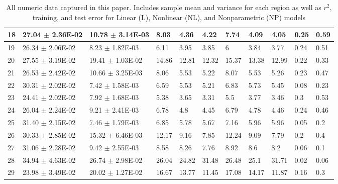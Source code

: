 \documentclass[12pt]{article}
\begin{document}
\begin{landscape}
\begin{table}
\begin{tabular}{|l|l|l|l|l|l|l|l|l|l|l|}
18&27.04 $\pm$ 2.36E-02& 10.78 $\pm$ 3.14E-03&8.03&4.36&4.22&7.74&4.09&4.05&0.25&0.59\\\hline
19&26.34 $\pm$ 2.06E-02& 8.23 $\pm$ 1.82E-03&6.11&3.95&3.85&6&3.84&3.77&0.24&0.51\\\hline
20&27.55 $\pm$ 3.19E-02& 19.41 $\pm$ 1.03E-02&14.86&12.81&12.32&15.37&13.38&12.99&0.22&0.33\\\hline
21&26.53 $\pm$ 2.42E-02& 10.66 $\pm$ 3.25E-03&8.06&5.53&5.22&8.07&5.53&5.26&0.23&0.47\\\hline
22&30.31 $\pm$ 2.02E-02& 7.42 $\pm$ 1.58E-03&6.59&5.53&5.21&6.83&5.73&5.45&0.08&0.23\\\hline
23&24.41 $\pm$ 2.02E-02& 7.92 $\pm$ 1.68E-03&5.38&3.65&3.31&5.5&3.77&3.46&0.3&0.53\\\hline
24&26.04 $\pm$ 2.24E-02& 9.21 $\pm$ 2.41E-03&6.78&4.8&4.45&6.79&4.78&4.46&0.24&0.46\\\hline
25&31.40 $\pm$ 2.15E-02& 7.46 $\pm$ 1.79E-03&6.85&5.78&5.67&7.16&5.96&5.96&0.05&0.2\\\hline
26&30.33 $\pm$ 2.85E-02& 15.32 $\pm$ 6.46E-03&12.17&9.16&7.85&12.24&9.09&7.79&0.2&0.4\\\hline
27&31.06 $\pm$ 2.28E-02& 9.42 $\pm$ 2.55E-03&8.58&8.26&7.76&8.92&8.6&8.2&0.06&0.1\\\hline
28&34.94 $\pm$ 4.63E-02& 26.74 $\pm$ 2.98E-02&26.04&24.82&31.48&26.48&25.1&31.71&0.02&0.06\\\hline
29&23.98 $\pm$ 3.49E-02& 20.02 $\pm$ 1.27E-02&16.67&13.77&11.45&17.08&14.17&11.87&0.16&0.3\\\hline
\end{tabular}
\caption{All numeric data captured in this paper. Includes sample mean and variance for each region as well as $r^2$, training, and test error for Linear (L), Nonlinear (NL), and Nonparametric (NP) models}
\label{resultstable}
\end{table}
\end{landscape}
\end{document}
